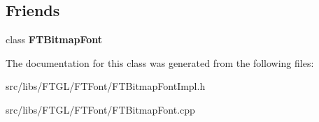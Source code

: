 \subsection*{Friends}
\begin{DoxyCompactItemize}
\item 
\hypertarget{class_f_t_bitmap_font_impl_a7ba5a198d501799828a37b4b808b9352}{
class {\bfseries FTBitmapFont}}
\label{class_f_t_bitmap_font_impl_a7ba5a198d501799828a37b4b808b9352}

\end{DoxyCompactItemize}


The documentation for this class was generated from the following files:\begin{DoxyCompactItemize}
\item 
src/libs/FTGL/FTFont/FTBitmapFontImpl.h\item 
src/libs/FTGL/FTFont/FTBitmapFont.cpp\end{DoxyCompactItemize}
